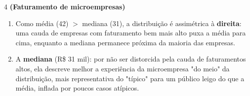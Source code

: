\documentclass[11pt]{article}
\begin{document}
\begin{questao}{4} \textbf{(Faturamento de microempresas)}
\begin{solucao}
\begin{enumerate}[label=(\alph*)]
  \item Como média (42) $>$ mediana (31), a distribuição é assimétrica à \textbf{direita}: uma
    cauda de empresas com faturamento bem mais alto puxa a média para cima, enquanto a mediana
    permanece próxima da maioria das empresas.
  \item A \textbf{mediana} (R\$ 31 mil): por não ser distorcida pela cauda de faturamentos altos,
    ela descreve melhor a experiência da microempresa "do meio" da distribuição, mais representativa
    do "típico" para um público leigo do que a média, inflada por poucos casos atípicos.
\end{enumerate}
\end{solucao}
\end{questao}
\end{document}
